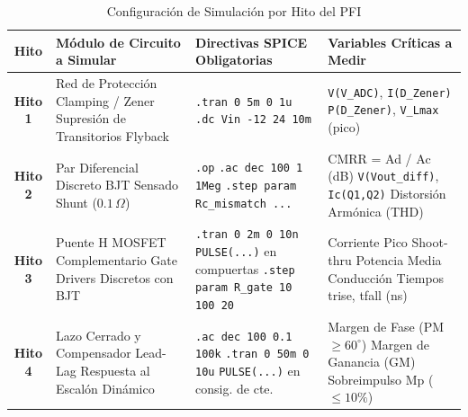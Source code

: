 \documentclass[11pt, a4paper]{article}
\begin{document}
\begin{table}[h!]
\centering
\caption{Configuración de Simulación por Hito del PFI}
\label{tab:spice_matrix}
\footnotesize
\renewcommand{\arraystretch}{1.5}
\begin{tabularx}{\textwidth}{@{} c >{\raggedright\arraybackslash}X >{\raggedright\arraybackslash}X >{\raggedright\arraybackslash}X @{}}
\toprule
\textbf{Hito} & \textbf{Módulo de Circuito a Simular} & \textbf{Directivas SPICE Obligatorias} & \textbf{Variables Críticas a Medir} \\
\midrule
\textbf{Hito 1} & 
Red de Protección Clamping / Zener \newline Supresión de Transitorios Flyback & 
\texttt{.tran 0 5m 0 1u} \newline \texttt{.dc Vin -12 24 10m} & 
\texttt{V(V\_ADC)}, \texttt{I(D\_Zener)} \newline \texttt{P(D\_Zener)}, \texttt{V\_Lmax} (pico) \\

\textbf{Hito 2} & 
Par Diferencial Discreto BJT \newline Sensado Shunt ($0.1\,\Omega$) & 
\texttt{.op} \newline \texttt{.ac dec 100 1 1Meg} \newline \texttt{.step param Rc\_mismatch ...} & 
CMRR = Ad / Ac (dB) \newline \texttt{V(Vout\_diff)}, \texttt{Ic(Q1,Q2)} \newline Distorsión Armónica (THD) \\

\textbf{Hito 3} & 
Puente H MOSFET Complementario \newline Gate Drivers Discretos con BJT & 
\texttt{.tran 0 2m 0 10n} \newline \texttt{PULSE(...)} en compuertas \newline \texttt{.step param R\_gate 10 100 20} & 
Corriente Pico Shoot-thru \newline Potencia Media Conducción \newline Tiempos trise, tfall (ns) \\

\textbf{Hito 4} & 
Lazo Cerrado y Compensador Lead-Lag \newline Respuesta al Escalón Dinámico & 
\texttt{.ac dec 100 0.1 100k} \newline \texttt{.tran 0 50m 0 10u} \newline \texttt{PULSE(...)} en consig. de cte. & 
Margen de Fase (PM $\ge 60^\circ$) \newline Margen de Ganancia (GM) \newline Sobreimpulso Mp ($\le 10\%$) \\
\bottomrule
\end{tabularx}
\end{table}
\end{document}

